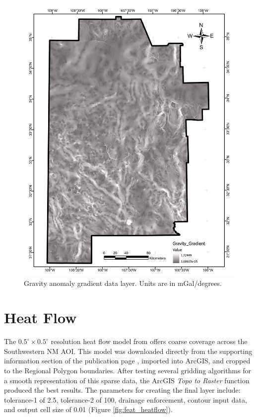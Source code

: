 \begin{figure}[H]
\centering
\includegraphics[width=0.75\linewidth]{templates/images/Figure-GravityGradient.pdf}
\caption[Gravity anomaly gradient data layer]{Gravity anomaly gradient data layer. Units are in mGal/degrees.}
\label{fig:feat_gravity_gradient}
\end{figure}
\pagebreak

\section{Heat Flow}\label{app:dl_heat_flow}
The \(0.5^\circ\times0.5^\circ\) resolution heat flow model from \citet{lucazeau_analysis_2019} offers coarse coverage across the Southwestern NM AOI. This model was downloaded directly from the supporting information section of the publication page \citep{lucazeau_analysis_2019}, imported into ArcGIS, and cropped to the Regional Polygon boundaries. After testing several gridding algorithms for a smooth representation of this sparse data, the ArcGIS \textit{Topo to Raster} function produced the best results. The parameters for creating the final layer include: tolerance-1 of 2.5, tolerance-2 of 100, drainage enforcement, contour input data, and output cell size of 0.01 (Figure \ref{fig:feat_heatflow}).
\vfill
\pagebreak

